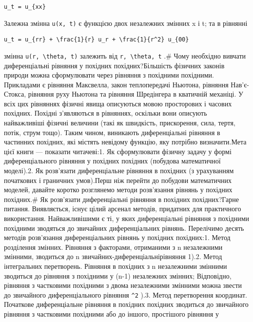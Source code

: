 \documentclass[
  ukrainian,
]{article}
\begin{document}
\begin{verbatim}
u_t = u_{xx}
\end{verbatim}

Залежна змінна \texttt{u(x,\ t)} є функцією двох незалежних змінних x і
t; та в рівнянні

\begin{verbatim}
u_t = u_{rr} + \frac{1}{r} u_r + \frac{1}{r^2} u_{00}
\end{verbatim}

змінна \texttt{u(r,\ \textbackslash{}theta,\ t)} залежить від
\texttt{r,\ \textbackslash{}theta,\ t} .\# Чому необхідно вивчати
диференціальні рівняння у похідних похідних?Більшість фізичних законів
природи можна сформулювати через рівняння з похідними похідними.
Прикладами є рівняння Максвелла, закон теплопередачі Ньютона, рівняння
Нав'є-Стокса, рівняння руху Ньютона та рівняння Шредінгера в кватичній
механіці. У всіх цих рівняннях фізичні явища описуються мовою
просторових і часових похідних. Похідні з'являються в рівняннях,
оскільки вони описують найважливіші фізичні величини (такі як швидкість,
прискорення, сила, тертя, потік, струм тощо). Таким чином, виникають
диференціальні рівняння в частинних похідних, які містять невідому
функцію, яку потрібно визначити.Мета цієї книги --- показати читачеві:1.
Як сформулювати фізичну задачу у формі диференціального рівняння у
похідних похідних (побудова математичної моделі).2. Як розв'язати
диференціальне рівняння в похідних (з урахуванням початкових і граничних
умов).Перш ніж перейти до побудови математичних моделей, давайте коротко
розглянемо методи розв'язання рівнянь у похідних похідних.\# Як
розв'язати диференціальні рівняння в похідних похідних?Гарне питання.
Виявляється, існує цілий арсенал методів, придатних для практичного
використання. Найважливішими є ті, у яких диференціальні рівняння з
похідними похідними зводяться до звичайних диференціальних рівнянь.
Перелічимо десять методів розв'язання диференціальних рівнянь у похідних
похідних:1. Метод розділення змінних. Рівняння з факторами, отриманими з
n незалежними змінними, зводиться до n звичайних-диференціальнірівняння
1).2. Метод інтегральних перетворень. Рівняння в похідних з n
незалежними змінними зводиться до рівняння з похідними у (n-1)
незалежних змінних; Відповідно, рівняння з частковими похідними з двома
незалежними змінними можна звести до звичайного диференціального
рівняння \texttt{\^{}2} ).3. Метод перетворення координат. Початкове
диференціальне рівняння в похідних похідних зводиться до звичайного
рівняння з частковими похідними або до іншого, простішого рівняння у
\end{document}
